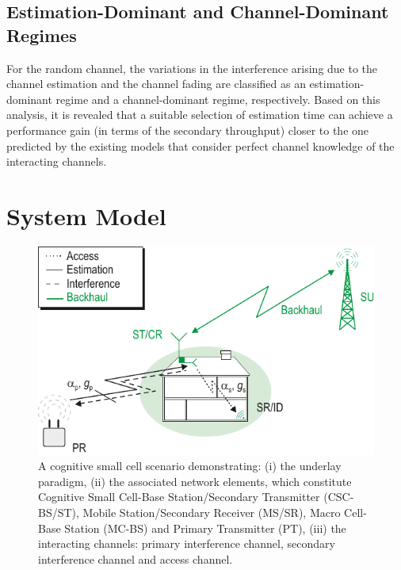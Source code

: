 \subsection{Estimation-Dominant and Channel-Dominant Regimes}
For the random channel, the variations in the interference arising due to the channel estimation and the channel fading are classified as an estimation-dominant regime and a channel-dominant regime, respectively. Based on this analysis, it is revealed that a suitable selection of estimation time can achieve a performance gain (in terms of the secondary throughput) closer to the one predicted by the existing models that consider perfect channel knowledge of the interacting channels.


\section{System Model} \label{sec_US:sys_mod}
\begin{figure}[!ht]
\centering
\includegraphics[width = \figscalet]{figures/CR_Scenario_Underlay}
\caption{A cognitive small cell scenario demonstrating: (i) the underlay paradigm, (ii) the associated network elements, which constitute Cognitive Small Cell-Base Station/Secondary Transmitter (CSC-BS/ST), Mobile Station/Secondary Receiver (MS/SR), Macro Cell-Base Station (MC-BS) and Primary Transmitter (PT), (iii) the interacting channels: primary interference channel, secondary interference channel and access channel.}
\label{fig_US:scenario}
\end{figure}

